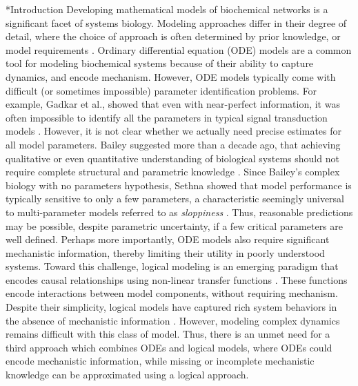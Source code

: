 \documentclass[12pt]{article}
\makeatletter
\renewcommand\section{\@startsection
	{subsection}{2}{0mm}
	{-0.2in}
	{0.05\baselineskip}
	{\normalfont\large\bfseries}}
\makeatother
\begin{document}
\section*{Introduction}
Developing mathematical models of biochemical networks is a significant facet of systems biology.
Modeling approaches differ in their degree of detail, where the choice of approach is often determined by prior knowledge, or model requirements \citep{2012_kholodenko_kolch_SciSig}. 
Ordinary differential equation (ODE) models are a common tool for modeling biochemical systems because of their ability to capture dynamics, and encode mechanism.
However, ODE models typically come with difficult (or sometimes impossible) parameter identification problems. 
For example, Gadkar et al., showed that even with near-perfect information, 
it was often impossible to identify all the parameters in typical signal transduction models \citep{Gadkar:2005ad}. 
However, it is not clear whether we actually need precise estimates for all model parameters. 
Bailey suggested more than a decade ago, that achieving qualitative or even quantitative understanding of biological systems 
should not require complete structural and parametric knowledge \citep{2001_bailey_NatBiotech}. 
Since Bailey's complex biology with no parameters hypothesis, Sethna showed that model performance is typically 
sensitive to only a few parameters, a characteristic seemingly universal to multi-parameter models referred to as \textit{sloppiness} \citep{Machta:2013aa}.
Thus, reasonable predictions may be possible, despite parametric uncertainty, if a few critical parameters are well defined. 
Perhaps more importantly, ODE models also require significant mechanistic information, thereby limiting their utility in poorly understood systems.
Toward this challenge, logical modeling is an emerging paradigm that encodes causal relationships using non-linear transfer functions \citep{Morris:2010aa}.
These functions encode interactions between model components, without requiring mechanism.
Despite their simplicity, logical models have captured rich system behaviors in the absence of mechanistic information \citep{Saez-Rodriguez:2011aa,Morris:2011ys,Morris:2012aa}. 
However, modeling complex dynamics remains difficult with this class of model.
Thus, there is an unmet need for a third approach which combines ODEs and logical models, where ODEs could encode mechanistic information, 
while missing or incomplete mechanistic knowledge can be approximated using a logical approach.  
\end{document}
